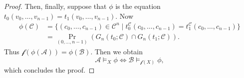\documentclass[10pt,a4paper]{amsart}
\newcommand{\A}{\mathcal{A}}
\newcommand{\B}{\mathcal{B}}
\newcommand{\C}{\mathcal{C}}
\newcommand{\f}{\mathcal{f}}
\begin{document}
\begin{proof}
    Then, finally, suppose that $\phi$ is the equation $t_0(v_0,\dots,v_{n-1}) = t_1(v_0,\dots,v_{n-1})$. Now
    \begin{align*}
        \phi(\C) &= \{ (c_0,\dots,c_{n-1})\in\C^n \mid t_0^\C(c_0,\dots,c_{n-1}) = t_1^\C(c_0,\dots,c_{n-1}) \} \\
        &= \Pr_{(0,\dots,n-1)}(G_n(t_0;\C)\cap G_n(t_1;\C)).
    \end{align*}
    Thus $\f(\phi(\A)) = \phi(\B)$. Then we obtain
    \[
        \A\models_X\phi \iff \B\models_{\f(X)}\phi,
    \]
    which concludes the proof. \qedhere
\end{proof}
\end{document}
